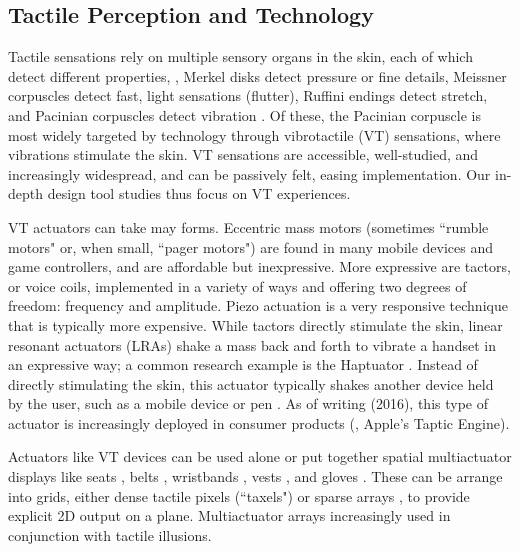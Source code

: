 \subsection{Tactile Perception and Technology}
Tactile sensations rely on multiple sensory organs in the skin, each of which detect different properties, \eg, Merkel disks detect pressure or fine details, Meissner corpuscles detect fast, light sensations (flutter), Ruffini endings detect stretch, and Pacinian corpuscles detect vibration \cite{ChoiKuchenbecker2013}.
Of these, the Pacinian corpuscle is most widely targeted by technology through vibrotactile (VT) sensations, where vibrations stimulate the skin.
VT sensations are accessible, well-studied, and increasingly widespread, and can be passively felt, easing implementation.
Our in-depth design tool studies thus focus on VT experiences.

VT actuators can take may forms.
Eccentric mass motors (sometimes ``rumble motors" or, when small, ``pager motors") are found in many mobile devices and game controllers, and are affordable but inexpressive.
More expressive are tactors, or voice coils, implemented in a variety of ways and offering two degrees of freedom: frequency and amplitude.
Piezo actuation is a very responsive technique that is typically more expensive.
While tactors directly stimulate the skin, linear resonant actuators (LRAs) shake a mass back and forth to vibrate a handset in an expressive way; a common research example is the Haptuator \cite{Yao2010}.
Instead of directly stimulating the skin, this actuator typically shakes another device held by the user, such as a mobile device \cite{Yoo2014} or pen \cite{Culbertson2014}.
As of writing (2016), this type of actuator is increasingly deployed in consumer products (\eg, Apple's Taptic Engine).

Actuators like VT devices can be used alone or put together spatial multiactuator displays like seats \cite{Israr2012,Israr2010}, belts \cite{Pielot2009,Paneels2013}, wristbands \cite{Arab2015,Paneels2013,Gupta2016}, vests \cite{Prasad2014,Jones2004}, and gloves \cite{Park2016,Kim2009}.
These can be arrange into grids, either dense tactile pixels (``taxels") \cite{Kim2009} or sparse arrays \cite{Israr2012,Israr2010}, to provide explicit 2D output on a plane.
Multiactuator arrays increasingly used in conjunction with tactile illusions.


